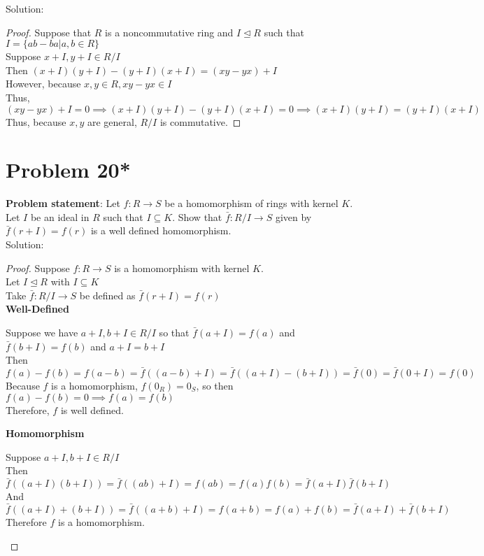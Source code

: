 \documentclass{article} %
\begin{document}
Solution: 
\begin{addmargin}[1em]{0em}
\begin{proof}
Suppose that $R$ is a noncommutative ring and $I \unlhd R$ such that $I = \{ab - ba|a,b \in R\}$
\\ Suppose $x+I,y+I \in R/I$
\\ Then $(x+I)(y+I) - (y+I)(x+I) = (xy - yx) + I$
\\ However, because $x,y \in R, xy - yx \in I$
\\ Thus, $(xy - yx) + I = 0 \implies (x+I)(y+I) - (y+I)(x+I) = 0 \implies (x+I)(y+I) = (y+I)(x+I)$
\\ Thus, because $x,y$ are general, $R/I$ is commutative.
\end{proof}
\end{addmargin}

\newpage

\section*{Problem 20*}


\textbf{Problem statement}: Let $f: R \rightarrow S$ be a homomorphism of rings with kernel $K$.  Let $I$ be an ideal in $R$ such that $I \subseteq K$.  Show that $\bar{f}: R/I \rightarrow S$ given by $\bar{f}(r + I) = f(r)$ is a well defined homomorphism.
\\

Solution: 
\begin{addmargin}[1em]{0em}
\begin{proof}
Suppose $f:R \rightarrow S$ is a homomorphism with kernel $K$.
\\Let $I \unlhd R$ with $I \subseteq K$
\\Take $\bar{f}:R/I \rightarrow S$ be defined as $\bar{f}(r + I) = f(r)$
\\ \textbf{Well-Defined}
\begin{addmargin}[1em]{0em}
Suppose we have $a + I, b + I \in R/I$ so that $\bar{f}(a+I) = f(a)$ and $\bar{f}(b + I) = f(b)$ and $a + I = b + I$
\\Then $f(a) - f(b) = f(a - b) = \bar{f}((a-b) + I) = \bar{f}((a+I) - (b + I)) = \bar{f}(0) = \bar{f}(0 + I) = f(0)$
\\Because $f$ is a homomorphism, $f(0_R) = 0_S$, so then $f(a) - f(b) = 0 \implies f(a) = f(b)$
\\Therefore, $f$ is well defined.        
\end{addmargin}
\textbf{Homomorphism}
\begin{addmargin}[1em]{0em}
Suppose $a + I, b + I \in R/I$
\\Then $\bar{f}((a+I)(b+I)) = \bar{f}((ab)+I) = f(ab) = f(a)  f(b) = \bar{f}(a+I)\bar{f}(b+I)$
\\And $\bar{f}((a+I) + (b+I)) = \bar{f}((a + b) + I) = f(a + b) = f(a) + f(b) = \bar{f}(a+I) + \bar{f}(b+I)$
\\Therefore $f$ is a homomorphism.
\end{addmargin}
\end{proof}
\end{addmargin}
\end{document}

